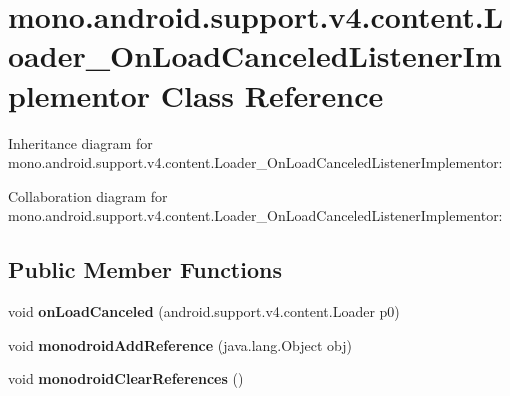 \hypertarget{classmono_1_1android_1_1support_1_1v4_1_1content_1_1_loader___on_load_canceled_listener_implementor}{}\section{mono.\+android.\+support.\+v4.\+content.\+Loader\+\_\+\+On\+Load\+Canceled\+Listener\+Implementor Class Reference}
\label{classmono_1_1android_1_1support_1_1v4_1_1content_1_1_loader___on_load_canceled_listener_implementor}


Inheritance diagram for mono.\+android.\+support.\+v4.\+content.\+Loader\+\_\+\+On\+Load\+Canceled\+Listener\+Implementor\+:


Collaboration diagram for mono.\+android.\+support.\+v4.\+content.\+Loader\+\_\+\+On\+Load\+Canceled\+Listener\+Implementor\+:
\subsection*{Public Member Functions}
\begin{DoxyCompactItemize}
\item 
\mbox{\label{classmono_1_1android_1_1support_1_1v4_1_1content_1_1_loader___on_load_canceled_listener_implementor_a30211744da81687fe1fcdea96162b15d}} 
void {\bfseries on\+Load\+Canceled} (android.\+support.\+v4.\+content.\+Loader p0)
\item 
\mbox{\label{classmono_1_1android_1_1support_1_1v4_1_1content_1_1_loader___on_load_canceled_listener_implementor_a5e5e1c8f0bda08b7e26819e4ee995873}} 
void {\bfseries monodroid\+Add\+Reference} (java.\+lang.\+Object obj)
\item 
\mbox{\label{classmono_1_1android_1_1support_1_1v4_1_1content_1_1_loader___on_load_canceled_listener_implementor_a4eb6431594cba99ef29e0a08f9fb6904}} 
void {\bfseries monodroid\+Clear\+References} ()
\end{DoxyCompactItemize}
